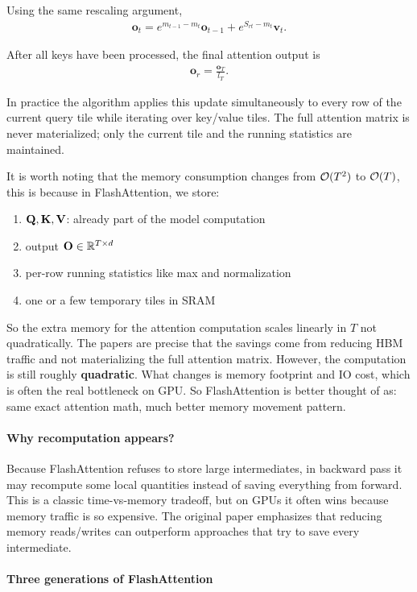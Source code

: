 \documentclass[11pt]{article}  %
\begin{document}
Using the same rescaling argument,
\begin{align*}
\mathbf{o}_t
=
e^{m_{t-1}-m_t}\mathbf{o}_{t-1}
+
e^{S_{rt}-m_t}\mathbf{v}_t .
\end{align*}

After all keys have been processed, the final attention output is
\begin{align*}
\mathbf{o}_r = \frac{\mathbf{o}_T}{l_T}.
\end{align*}

In practice the algorithm applies this update simultaneously to every
row of the current query tile while iterating over key/value tiles.
The full attention matrix is never materialized; only the current tile
and the running statistics are maintained.

It is worth noting that the memory consumption changes from $\mathcal{O}(T^2)$ to $\mathcal{O}(T)$, this is because in FlashAttention, we store:
\begin{enumerate}
  \item $\mathbf{Q}, \mathbf{K}, \mathbf{V}$: already part of the model computation
  \item output $\mathbf{O} \in \mathbb{R}^{T \times d}$
  \item per-row running statistics like max and normalization
  \item one or a few temporary tiles in SRAM
\end{enumerate} 
So the extra memory for the attention computation scales linearly in $T$ not quadratically.
The papers are precise that the savings come from reducing HBM traffic and not materializing the full attention matrix.
However, the computation is still roughly \textbf{quadratic}.
What changes is memory footprint and IO cost, which is often the real bottleneck on GPU. So FlashAttention is better thought of as: same exact attention math, much better memory movement pattern.

\paragraph{Why recomputation appears?}
Because FlashAttention refuses to store large intermediates, in backward pass it may recompute some local quantities instead of saving everything from forward. This is a classic time-vs-memory tradeoff, but on GPUs it often wins because memory traffic is so expensive. The original paper emphasizes that reducing memory reads/writes can outperform approaches that try to save every intermediate.


\paragraph{Three generations of FlashAttention}
\end{document}
